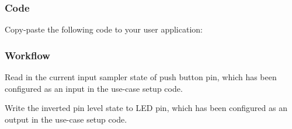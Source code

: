 \hypertarget{asfdoc_sam0_port_basic_use_case_asfdoc_sam0_port_basic_use_case_code}{}\subsubsection{Code}\label{asfdoc_sam0_port_basic_use_case_asfdoc_sam0_port_basic_use_case_code}
Copy-\/paste the following code to your user application\+: 
\begin{DoxyCodeInclude}{0}
\end{DoxyCodeInclude}
 \hypertarget{asfdoc_sam0_port_basic_use_case_asfdoc_sam0_port_basic_use_case_flow}{}\subsubsection{Workflow}\label{asfdoc_sam0_port_basic_use_case_asfdoc_sam0_port_basic_use_case_flow}

\begin{DoxyEnumerate}
\item Read in the current input sampler state of push button pin, which has been configured as an input in the use-\/case setup code. 
\begin{DoxyCodeInclude}{0}
\end{DoxyCodeInclude}

\item Write the inverted pin level state to L\+ED pin, which has been configured as an output in the use-\/case setup code. 
\begin{DoxyCodeInclude}{0}
\end{DoxyCodeInclude}

\end{DoxyEnumerate}